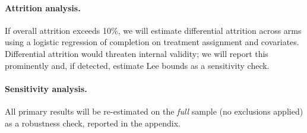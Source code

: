 \paragraph{Attrition analysis.}
If overall attrition exceeds 10\%, we will estimate differential attrition across arms using a logistic regression of completion on treatment assignment and covariates.
Differential attrition would threaten internal validity; we will report this prominently and, if detected, estimate Lee bounds \citep{Lee2009} as a sensitivity check.

\paragraph{Sensitivity analysis.}
All primary results will be re-estimated on the \textit{full} sample (no exclusions applied) as a robustness check, reported in the appendix.
